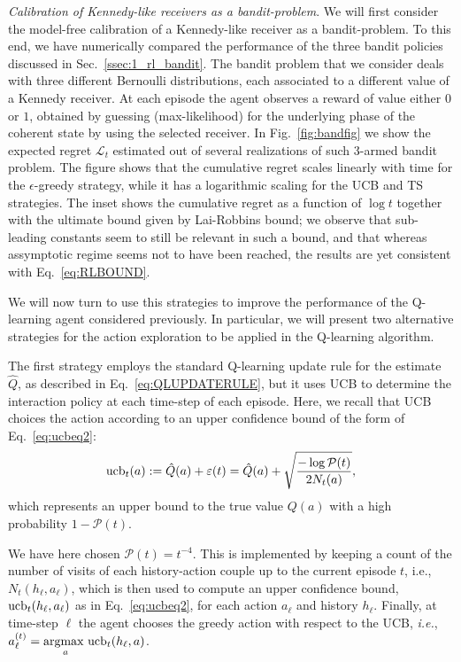 \textit{Calibration of Kennedy-like receivers as a bandit-problem}. We will first consider the model-free calibration of a Kennedy-like receiver as a bandit-problem. To this end, we have numerically compared the performance of the three bandit policies discussed in Sec.~\ref{ssec:1_rl_bandit}. The bandit problem that we consider deals with three different Bernoulli distributions, each associated to a different value of a Kennedy receiver. At each episode the agent observes a reward of value either $0$ or $1$, obtained by guessing (max-likelihood) for the underlying phase of the coherent state by using the selected receiver. In Fig.~\ref{fig:bandfig} we show the expected regret $\mathcal{L}_t$ estimated out of several realizations of such 3-armed bandit problem. The figure shows that the cumulative regret scales linearly with time for the $\epsilon$-greedy strategy, while it has a logarithmic scaling for the UCB and TS strategies. The inset shows the cumulative regret as a function of $\log t$ together with the ultimate bound given by Lai-Robbins bound; we observe that sub-leading constants seem to still be relevant in such a bound, and that whereas assymptotic regime seems not to have been reached, the results are yet consistent with Eq.~\ref{eq:RLBOUND}.

We will now turn to use this strategies to improve the performance of the Q-learning agent considered previously. In particular, we will present two alternative strategies for the action exploration to be applied in the Q-learning algorithm.

The first strategy employs the standard Q-learning update rule for the estimate $\hat{Q}$, as described in Eq.~\eqref{eq:QLUPDATERULE}, but it uses UCB to determine the interaction policy at each time-step of each episode. Here, we recall that UCB choices the action according to an upper confidence bound of the form of Eq.~\ref{eq:ucbeq2}:
\begin{equation}
{\rm ucb}_{t}(a):=\hat{Q}(a)+\varepsilon(t) = \hat{Q}(a)+\sqrt{\frac{-\log \mathcal{P}(t)}{2 N_{t}(a)}} ,
\end{equation}
which represents an upper bound to the true value ${Q}(a)$ with a high probability $1-\mathcal{P}(t)$.

We have here chosen $\mathcal{P}(t)=t^{-4}$. This is implemented by keeping a count of the number of visits of each history-action couple up to the current episode $t$, i.e., $N_{t}(h_{\ell},a_{\ell})$, which is then used to compute an upper confidence bound, ${\rm ucb}_{t}(h_{\ell},a_{\ell})$ as in Eq.~\eqref{eq:ucbeq2}, for each action $a_{\ell}$ and history $h_{\ell}$. Finally, at time-step $\ell$ the agent chooses the greedy action with respect to the UCB, \textit{i.e.}, $a_{\ell}^{(t)}=\underset{a}{\text{argmax }}{\rm ucb}_{t}(h_{\ell},a)$.

